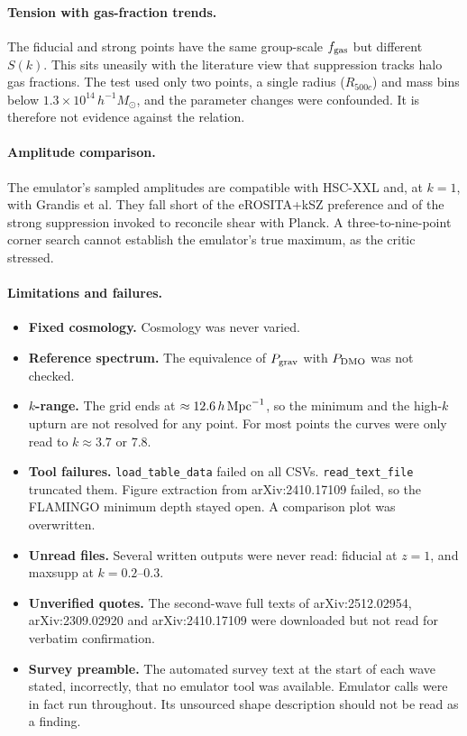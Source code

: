 \documentclass[11pt,a4paper]{article}
\begin{document}
\paragraph{Tension with gas-fraction trends.} The fiducial and strong points have the same group-scale $f_{\rm gas}$ but different $S(k)$. This sits uneasily with the literature view that suppression tracks halo gas fractions. The test used only two points, a single radius ($R_{500c}$) and mass bins below $1.3\times10^{14}\,h^{-1}M_\odot$, and the parameter changes were confounded. It is therefore not evidence against the relation.

\paragraph{Amplitude comparison.} The emulator's sampled amplitudes are compatible with HSC-XXL and, at $k=1$, with Grandis et al. They fall short of the eROSITA+kSZ preference and of the strong suppression invoked to reconcile shear with Planck. A three-to-nine-point corner search cannot establish the emulator's true maximum, as the critic stressed.

\paragraph{Limitations and failures.}
\begin{itemize}
\item \textbf{Fixed cosmology.} Cosmology was never varied.
\item \textbf{Reference spectrum.} The equivalence of $P_{\rm grav}$ with $P_{\rm DMO}$ was not checked.
\item \textbf{$k$-range.} The grid ends at $\approx12.6\,h\,{\rm Mpc}^{-1}$, so the minimum and the high-$k$ upturn are not resolved for any point. For most points the curves were only read to $k\approx3.7$ or $7.8$.
\item \textbf{Tool failures.} \texttt{load\_table\_data} failed on all CSVs. \texttt{read\_text\_file} truncated them. Figure extraction from arXiv:2410.17109 failed, so the FLAMINGO minimum depth stayed open. A comparison plot was overwritten.
\item \textbf{Unread files.} Several written outputs were never read: fiducial at $z=1$, and maxsupp at $k=0.2$--$0.3$.
\item \textbf{Unverified quotes.} The second-wave full texts of arXiv:2512.02954, arXiv:2309.02920 and arXiv:2410.17109 were downloaded but not read for verbatim confirmation.
\item \textbf{Survey preamble.} The automated survey text at the start of each wave stated, incorrectly, that no emulator tool was available. Emulator calls were in fact run throughout. Its unsourced shape description should not be read as a finding.
\end{itemize}
\end{document}
